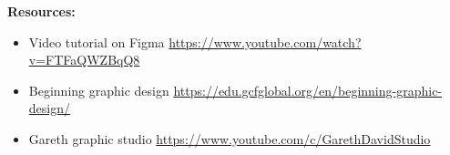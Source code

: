 \textbf{Resources:}

\begin{itemize}
\item Video tutorial on Figma \url{https://www.youtube.com/watch?v=FTFaQWZBqQ8}
\item Beginning graphic design \url{https://edu.gcfglobal.org/en/beginning-graphic-design/}
\item Gareth graphic studio \url{https://www.youtube.com/c/GarethDavidStudio}
\end{itemize}

